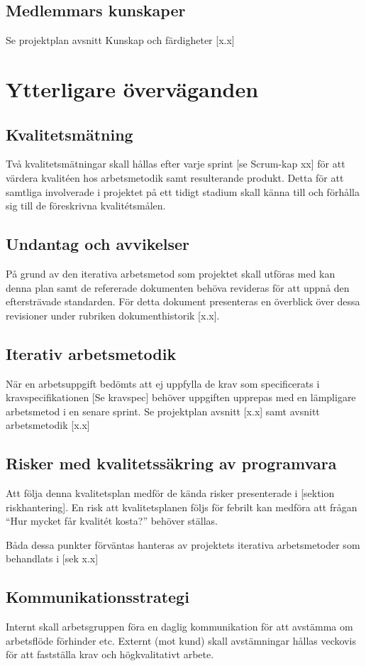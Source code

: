 \documentclass[a4paper,10pt]{article}
\begin{document}
\subsection{Medlemmars kunskaper}
Se projektplan avsnitt Kunskap och färdigheter [x.x]

\section{Ytterligare överväganden}

\subsection{Kvalitetsmätning}
Två kvalitetsmätningar skall hållas efter varje sprint [se Scrum-kap xx] för att värdera kvalitéen hos arbetsmetodik samt resulterande produkt. 
Detta för att samtliga involverade i  projektet på ett tidigt stadium skall känna till och förhålla sig till de föreskrivna kvalitétsmålen.

\subsection{Undantag och avvikelser}
På grund av den iterativa arbetsmetod som projektet skall utföras med kan denna plan samt de refererade dokumenten behöva revideras för att uppnå den eftersträvade standarden. För detta dokument presenteras en överblick över dessa revisioner under rubriken dokumenthistorik [x.x].

\subsection{Iterativ arbetsmetodik}
När en arbetsuppgift bedömts att ej uppfylla de krav som specificerats i kravspecifikationen [Se kravspec] behöver uppgiften upprepas med en lämpligare arbetsmetod i en senare sprint. Se projektplan avsnitt [x.x] samt avsnitt arbetsmetodik [x.x]

\subsection{Risker med kvalitetssäkring av programvara}
Att följa denna kvalitetsplan medför de kända risker presenterade i [sektion riskhantering].  En risk att kvalitetsplanen följs för febrilt kan medföra att frågan “Hur mycket får kvalitét kosta?” behöver ställas.

Båda dessa punkter förväntas hanteras av projektets iterativa arbetsmetoder som behandlats i [sek x.x]

\subsection{Kommunikationsstrategi}
Internt skall arbetsgruppen föra en daglig kommunikation för att avstämma om arbetsflöde förhinder etc.
Externt (mot kund) skall avstämningar hållas veckovis för att fastställa krav och högkvalitativt arbete.
\end{document}
